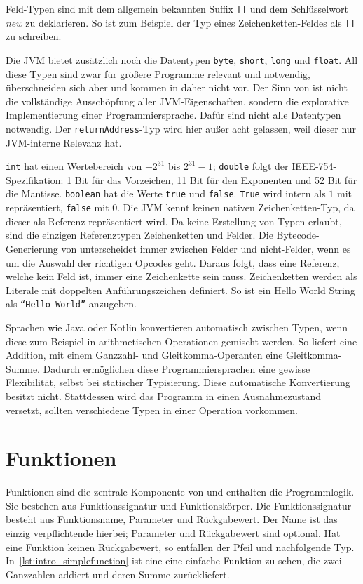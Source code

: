 Feld-Typen sind mit dem allgemein bekannten Suffix \texttt{[]} und dem Schlüsselwort \textit{new} zu deklarieren. So ist zum Beispiel der Typ eines Zeichenketten-Feldes als \texttt{[]} zu schreiben.

Die JVM bietet zusätzlich noch die Datentypen \texttt{byte}, \texttt{short}, \texttt{long} und \texttt{float}. All diese Typen sind zwar für größere Programme relevant und notwendig, überschneiden sich aber und kommen in \toya daher nicht vor. Der Sinn von \toya ist nicht die vollständige Ausschöpfung aller JVM-Eigenschaften, sondern die explorative Implementierung einer Programmiersprache. Dafür sind nicht alle Datentypen notwendig. Der \texttt{returnAddress}-Typ wird hier außer acht gelassen, weil dieser nur JVM-interne Relevanz hat.

\texttt{int} hat einen Wertebereich von $-2^{31}$ bis $2^{31} - 1$; \texttt{double} folgt der IEEE-754-Spezifikation: 1 Bit für das Vorzeichen, 11 Bit für den Exponenten und 52 Bit für die Mantisse. \texttt{boolean} hat die Werte \texttt{true} und \texttt{false}. \texttt{True} wird intern als $1$ mit repräsentiert, \texttt{false} mit 0. Die JVM kennt keinen nativen Zeichenketten-Typ, da dieser als Referenz repräsentiert wird. Da \toya keine Erstellung von Typen erlaubt, sind die einzigen Referenztypen Zeichenketten und Felder. Die Bytecode-Generierung von \toya unterscheidet immer zwischen Felder und nicht-Felder, wenn es um die Auswahl der richtigen Opcodes geht. Daraus folgt, dass eine Referenz, welche kein Feld ist, immer eine Zeichenkette sein muss. Zeichenketten werden als Literale mit doppelten Anführungszeichen definiert. So ist ein Hello World String als \texttt{``Hello World''} anzugeben.

Sprachen wie Java oder Kotlin konvertieren automatisch zwischen Typen, wenn diese zum Beispiel in arithmetischen Operationen gemischt werden. So liefert eine Addition, mit einem Ganzzahl- und Gleitkomma-Operanten eine Gleitkomma-Summe. Dadurch ermöglichen diese Programmiersprachen eine gewisse Flexibilität, selbst bei statischer Typisierung. Diese automatische Konvertierung besitzt \toya nicht. Stattdessen wird das Programm in einen Ausnahmezustand versetzt, sollten verschiedene Typen in einer Operation vorkommen.

\section{Funktionen}

Funktionen sind die zentrale Komponente von \toya und enthalten die Programmlogik. Sie bestehen aus Funktionssignatur und Funktionskörper. Die Funktionssignatur besteht aus Funktionsname, Parameter und Rückgabewert. Der Name ist das einzig verpflichtende hierbei; Parameter und Rückgabewert sind optional. Hat eine Funktion keinen Rückgabewert, so entfallen der Pfeil und nachfolgende Typ. In~\autoref{lst:intro_simplefunction} ist eine eine einfache Funktion zu sehen, die zwei Ganzzahlen addiert und deren Summe zurückliefert.

